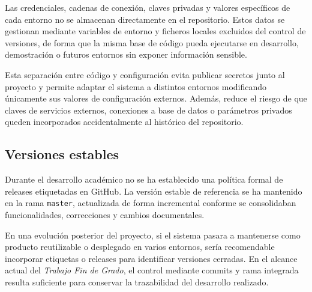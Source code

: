Las credenciales, cadenas de conexión, claves privadas y valores específicos de cada entorno no se almacenan directamente en el repositorio. Estos datos se gestionan mediante variables de entorno y ficheros locales excluidos del control de versiones, de forma que la misma base de código pueda ejecutarse en desarrollo, demostración o futuros entornos sin exponer información sensible.

Esta separación entre código y configuración evita publicar secretos junto al proyecto y permite adaptar el sistema a distintos entornos modificando únicamente sus valores de configuración externos. Además, reduce el riesgo de que claves de servicios externos, conexiones a base de datos o parámetros privados queden incorporados accidentalmente al histórico del repositorio.

\subsection{Versiones estables}

Durante el desarrollo académico no se ha establecido una política formal de releases etiquetadas en GitHub. La versión estable de referencia se ha mantenido en la rama \texttt{master}, actualizada de forma incremental conforme se consolidaban funcionalidades, correcciones y cambios documentales.

En una evolución posterior del proyecto, si el sistema pasara a mantenerse como producto reutilizable o desplegado en varios entornos, sería recomendable incorporar etiquetas o releases para identificar versiones cerradas. En el alcance actual del \textit{Trabajo Fin de Grado}, el control mediante commits y rama integrada resulta suficiente para conservar la trazabilidad del desarrollo realizado.
